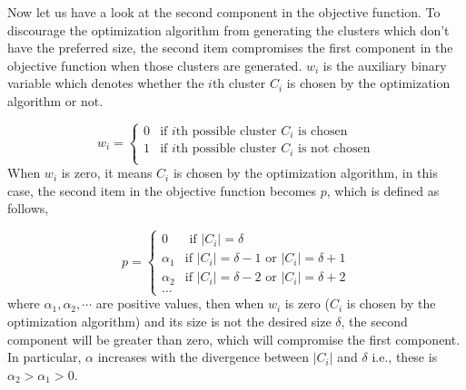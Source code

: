 \documentclass[10pt,journal,compsoc]{IEEEtran}
\theoremstyle{mytheoremstyle}
\theoremstyle{mytheoremstyle}
\theoremstyle{mytheoremstyle}
\newcommand{\ie}{i.e., }
\begin{document}
Now let us have a look at the second component in the objective function.
To discourage the optimization algorithm from generating the clusters which don't have the preferred size, the second item compromises the first component in the objective function when those clusters are generated.
$w_i$ is the auxiliary binary variable which denotes whether the $i$th  cluster $C_i$ is chosen by the optimization algorithm or not.


$$
w_i = \left\{ \begin{array}{rl}
0 &\mbox{if $i$th possible cluster $C_i$ is chosen} \\
1 &\mbox{if $i$th possible cluster $C_i$ is not chosen} \\
\end{array} \right.
$$
When $w_i$ is zero, it means $C_i$ is chosen by the optimization algorithm, in this case, the second item in the objective function becomes $p$, which is defined as follows,

$$
p = \left\{ \begin{array}{rl}
0 &\mbox{ if $|C_i|=\delta$} \\
\alpha_1 &\mbox{if $|C_i|=\delta-1$ or $|C_i|=\delta+1$} \\
\alpha_2 &\mbox{if $|C_i|=\delta-2$ or $|C_i|=\delta+2$} \\
\dots
\end{array} \right.
$$
where $\alpha_1, \alpha_2, \cdots$ are positive values, then when $w_i$ is zero ($C_i$ is chosen by the optimization algorithm) and its size is not the desired size $\delta$, the second component will be greater than zero, which will compromise the first component.
In particular, $\alpha$ increases with the divergence between $|C_i|$ and $\delta$ \ie these is $\alpha_2> \alpha_1>0$.
\end{document}
